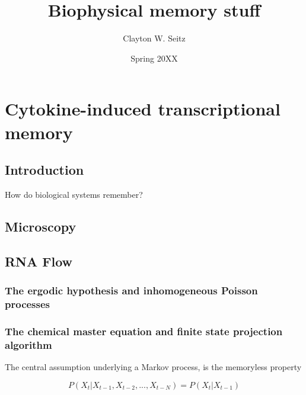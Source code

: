 \documentclass{ucetd}
\title{Biophysical memory stuff}
\author{Clayton W. Seitz}
\date{Spring 20XX}
\begin{document}
\maketitle

\makecopyright


\tableofcontents


\abstract



\clearpage

\mainmatter

\chapter{Cytokine-induced transcriptional memory}

\section{Introduction}

How do biological systems remember?


\section{Microscopy}


\section{RNA Flow}

\subsection{The ergodic hypothesis and inhomogeneous Poisson processes}

\subsection{The chemical master equation and finite state projection algorithm}

The central assumption underlying a Markov process, is the memoryless property

\begin{equation*}
P(X_{t}|X_{t-1}, X_{t-2}, ..., X_{t-N}) = P(X_{t}|X_{t-1})
\end{equation*}
\end{document}
